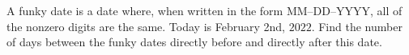 A funky date is a date where, when written in the form MM--DD--YYYY, all of the nonzero digits are the same. Today is February 2nd, $2022$. Find the number of days between the funky dates directly before and directly after this date.
